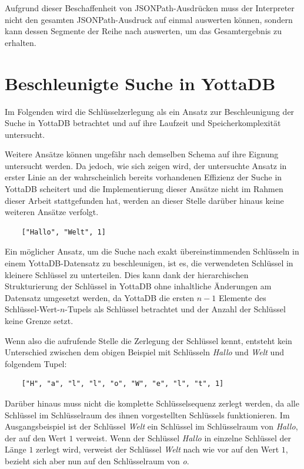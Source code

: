 \documentclass[oneside]{ausarbeitung}
\begin{document}
Aufgrund dieser Beschaffenheit von JSONPath-Ausdrücken muss der Interpreter nicht den gesamten JSONPath-Ausdruck auf einmal auswerten können, sondern kann dessen Segmente der Reihe nach auswerten, um das Gesamtergebnis zu erhalten.

	
\section{Beschleunigte Suche in YottaDB}
	
Im Folgenden wird die Schlüsselzerlegung als ein Ansatz zur Beschleunigung der Suche in YottaDB betrachtet und auf ihre Laufzeit und Speicherkomplexität untersucht. 

Weitere Ansätze können ungefähr nach demselben Schema auf ihre Eignung untersucht werden. Da jedoch, wie sich zeigen wird, der untersuchte Ansatz in erster Linie an der wahrscheinlich bereits vorhandenen Effizienz der Suche in YottaDB scheitert und die Implementierung dieser Ansätze nicht im Rahmen dieser Arbeit stattgefunden hat, werden an dieser Stelle darüber hinaus keine weiteren Ansätze verfolgt.


	
\begin{lstlisting}
	["Hallo", "Welt", 1]
\end{lstlisting}
	
Ein möglicher Ansatz, um die Suche nach exakt übereinstimmenden Schlüsseln in einem YottaDB-Datensatz zu beschleunigen, ist es, die verwendeten Schlüssel in kleinere Schlüssel zu unterteilen. Dies kann dank der hierarchischen Strukturierung der Schlüssel in YottaDB ohne inhaltliche Änderungen am Datensatz umgesetzt werden, da YottaDB die ersten $n-1$ Elemente des Schlüssel-Wert-$n$-Tupels als Schlüssel betrachtet und der Anzahl der Schlüssel keine Grenze setzt.
	
Wenn also die aufrufende Stelle die Zerlegung der Schlüssel kennt, entsteht kein Unterschied zwischen dem obigen Beispiel mit Schlüsseln \textit{Hallo} und \textit{Welt} und folgendem Tupel:
	
\begin{lstlisting}
	["H", "a", "l", "l", "o", "W", "e", "l", "t", 1]
\end{lstlisting}
	
Darüber hinaus muss nicht die komplette Schlüsselsequenz zerlegt werden, da alle Schlüssel im Schlüsselraum des ihnen vorgestellten Schlüssels funktionieren. Im Ausgangsbeispiel ist der Schlüssel \textit{Welt} ein Schlüssel im Schlüsselraum von \textit{Hallo}, der auf den Wert $1$ verweist. Wenn der Schlüssel \textit{Hallo} in einzelne Schlüssel der Länge $1$ zerlegt wird, verweist der Schlüssel \textit{Welt} nach wie vor auf den Wert $1$, bezieht sich aber nun auf den Schlüsselraum von \textit{o}. 
	
\end{document}
